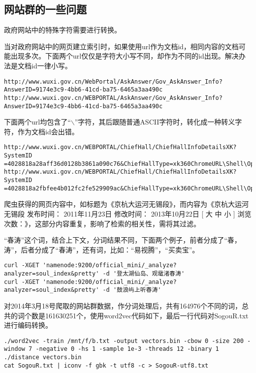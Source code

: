 \subsection{网站群的一些问题}
\par 政府网站中的特殊字符需要进行转换。
\par 当对政府网站中的网页建立索引时，如果使用url作为文档id，相同内容的文档可能出现多次。下面两个url仅仅是字符大小写不同，却作为不同的id出现。解决办法是文档id一律小写。
\begin{verbatim}
http://www.wuxi.gov.cn/WebPortal/AskAnswer/Gov_AskAnswer_Info?
AnswerID=9174e3c9-4bb6-41cd-ba75-6465a3aa490c
http://www.wuxi.gov.cn/WEBPORTAL/AskAnswer/Gov_AskAnswer_Info?
AnswerID=9174e3c9-4bb6-41cd-ba75-6465a3aa490c
\end{verbatim}
\par 下面两个url均包含了“$\backslash$”字符，其后跟随普通ASCII字符时，转化成一种转义字符，作为文档id会出错。
\begin{verbatim}
http://www.wuxi.gov.cn/WEBPORTAL/ChiefHall/ChiefHallInfoDetailsXK?SystemID
=4028818a28aff36d0128b3861a090c76&ChiefHallType=xk360ChromeURL\Shell\Open\Command
http://www.wuxi.gov.cn/WEBPORTAL/ChiefHall/ChiefHallInfoDetailsXK?SystemID
=4028818a2fbfee4b012fc2fe529909ac&ChiefHallType=xk360ChromeURL\Shell\Open\Command
\end{verbatim}
\par 爬虫获得的网页内容中，如标题为《京杭大运河无锡段》，而内容为《京杭大运河无锡段 发布时间： 2011年11月23日 修改时间： 2013年10月22日 [ 大 中 小 ] 浏览次数：》，这部分内容重复，影响了检索的相关性，需将其过滤。
\par “春涛”这个词，结合上下文，分词结果不同，下面两个例子，前者分成了“春，涛”，后者分成了“春涛”，还有词，比如：“易视腾”，“买卖宝”。
\begin{verbatim}
curl -XGET 'namenode:9200/official_mini/_analyze?analyzer=soul_index&pretty' -d '登太湖仙岛、观鼋渚春涛'
curl -XGET 'namenode:9200/official_mini/_analyze?analyzer=soul_index&pretty' -d '鼓浪屿上听春涛'
\end{verbatim}
\par 对2014年3月18号爬取的网站群数据，作分词处理后，共有164976个不同的词，总共的词个数是161630251个，使用word2vec代码如下，最后一行代码对SogouR.txt进行编码转换。
\begin{verbatim}
./word2vec -train /mnt/f/b.txt -output vectors.bin -cbow 0 -size 200 -window 7 -negative 0 -hs 1 -sample 1e-3 -threads 12 -binary 1
./distance vectors.bin
cat SogouR.txt | iconv -f gbk -t utf8 -c > SogouR-utf8.txt
\end{verbatim}
